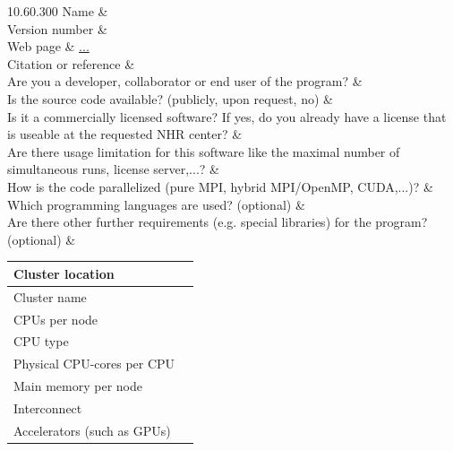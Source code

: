 \documentclass[whitelisted,showhints]{nhrproposal}
\begin{document}
\Titlepage

\ShortProjectDescription
{}

\ComputeResources
\CodeOverview
\begin{Codetable}{1}{0.6\linewidth}{0.3\linewidth}{0}{0} %
 Name           &  \\ \hline
 Version number &  \\ \hline
 Web page       & \url{...}   \\ \hline
 Citation or reference &   \\ \hline 
 Are you a developer, collaborator or end user of the program? &   \\ \hline
 Is the source code available? (publicly, upon request, no) &   \\ \hline
 Is it a commercially licensed software? If yes, do you already have a license that is useable at the requested NHR center?  &  \\ \hline
 Are there usage limitation for this software like the maximal number of simultaneous runs, license server,...?  &  \\ \hline
 How is the code parallelized (pure MPI, hybrid MPI/OpenMP, CUDA,...)? &  \\ \hline
 Which programming languages are used? (optional) &  \\ \hline
 Are there other further requirements (e.g. special libraries) for the program? (optional) &   \\ \hline
\end{Codetable}

\CodeBenchmarks
{}
\BenchmarkDescription

\BenchmarkSystem
\begin{center}
\begin{tabular}{|G{5cm}|L{10cm}|}\hline
Cluster location &  \\ \hline
Cluster name & \\ \hline
CPUs per node & \\ \hline
CPU type & \\ \hline
Physical CPU-cores per CPU & \\ \hline
Main memory per node & \\ \hline
Interconnect & \\ \hline
Accelerators (such as GPUs) & \\ \hline
\end{tabular}
\end{center}
\end{document}
